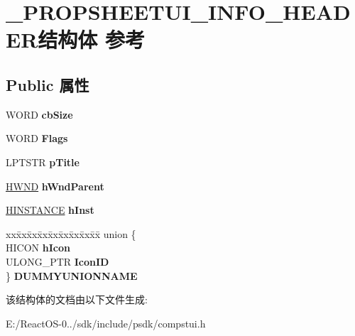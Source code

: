 \hypertarget{struct___p_r_o_p_s_h_e_e_t_u_i___i_n_f_o___h_e_a_d_e_r}{}\section{\+\_\+\+P\+R\+O\+P\+S\+H\+E\+E\+T\+U\+I\+\_\+\+I\+N\+F\+O\+\_\+\+H\+E\+A\+D\+E\+R结构体 参考}
\label{struct___p_r_o_p_s_h_e_e_t_u_i___i_n_f_o___h_e_a_d_e_r}
\subsection*{Public 属性}
\begin{DoxyCompactItemize}
\item 
\mbox{\label{struct___p_r_o_p_s_h_e_e_t_u_i___i_n_f_o___h_e_a_d_e_r_acc6d9a62e2d2906a4351b36af3b475f9}} 
W\+O\+RD {\bfseries cb\+Size}
\item 
\mbox{\label{struct___p_r_o_p_s_h_e_e_t_u_i___i_n_f_o___h_e_a_d_e_r_a2651fdd34cdfba1240eea400df772f02}} 
W\+O\+RD {\bfseries Flags}
\item 
\mbox{\label{struct___p_r_o_p_s_h_e_e_t_u_i___i_n_f_o___h_e_a_d_e_r_acc2fdc851a7aeae377dfc89c5c2e4250}} 
L\+P\+T\+S\+TR {\bfseries p\+Title}
\item 
\mbox{\label{struct___p_r_o_p_s_h_e_e_t_u_i___i_n_f_o___h_e_a_d_e_r_a9e6d27cb14f5e873830d7a127cb000cf}} 
\hyperlink{interfacevoid}{H\+W\+ND} {\bfseries h\+Wnd\+Parent}
\item 
\mbox{\label{struct___p_r_o_p_s_h_e_e_t_u_i___i_n_f_o___h_e_a_d_e_r_a05e57678d9d566d0edce17d9a73184c6}} 
\hyperlink{interfacevoid}{H\+I\+N\+S\+T\+A\+N\+CE} {\bfseries h\+Inst}
\item 
\mbox{\label{struct___p_r_o_p_s_h_e_e_t_u_i___i_n_f_o___h_e_a_d_e_r_a2a40321b646bc1caa4d98dac5b6332bc}} 
\begin{tabbing}
xx\=xx\=xx\=xx\=xx\=xx\=xx\=xx\=xx\=\kill
union \{\\
\>HICON {\bfseries hIcon}\\
\>ULONG\_PTR {\bfseries IconID}\\
\} {\bfseries DUMMYUNIONNAME}\\

\end{tabbing}\end{DoxyCompactItemize}


该结构体的文档由以下文件生成\+:\begin{DoxyCompactItemize}
\item 
E\+:/\+React\+O\+S-\/0../sdk/include/psdk/compstui.\+h\end{DoxyCompactItemize}
